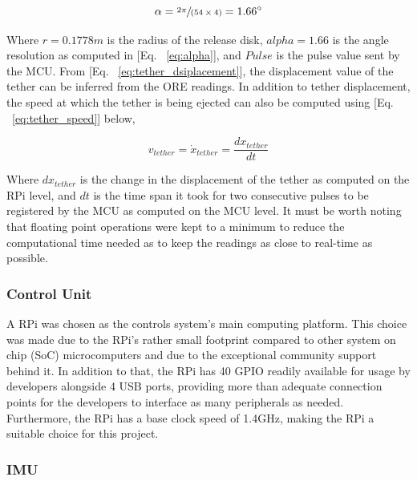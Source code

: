 \begin{equation}
	\alpha = \sfrac{2\pi}{(54\times4)} = 1.66\degree
    \label{eq:alpha}
\end{equation}

Where $r = 0.1778m$ is the radius of the release disk, $alpha = 1.66$ is the angle resolution as computed in [Eq. ~\ref{eq:alpha}], and $Pulse$ is the pulse value sent by the MCU. From [Eq. ~\ref{eq:tether_dsiplacement}], the displacement value of the tether can be inferred from the ORE readings. In addition to tether displacement, the speed at which the tether is being ejected can also be computed using [Eq. ~\ref{eq:tether_speed}] below,

\begin{equation}
	v_{tether} = \Dot{x}_{tether} = \dfrac{dx_{tether}}{dt}
    \label{eq:tether_speed}
\end{equation}

Where $dx_{tether}$ is the change in the displacement of the tether as computed on the RPi level, and $dt$ is the time span it took for two consecutive pulses to be registered by the MCU as computed on the MCU level. It must be worth noting that floating point operations were kept to a minimum to reduce the computational time needed as to keep the readings as close to real-time as possible.


\subsubsection{Control Unit}

\indent\indent A RPi was chosen as the controls system's main computing platform. This choice was made due to the RPi's rather small footprint compared to other system on chip (SoC) microcomputers and due to the exceptional community support behind it. In addition to that, the RPi has 40 GPIO readily available for usage by developers alongside 4 USB ports, providing more than adequate connection points for the developers to interface as many peripherals as needed. Furthermore, the RPi has a base clock speed of 1.4GHz, making the RPi a suitable choice for this project.


\subsubsection{IMU}


